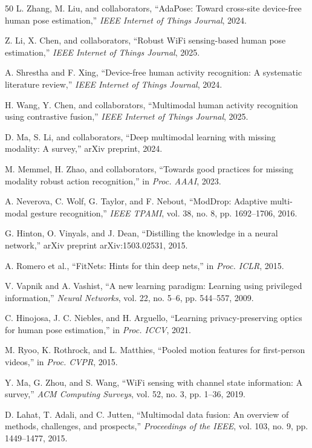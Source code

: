 \documentclass[journal]{IEEEtran}
\begin{document}
\begin{thebibliography}{50}
L. Zhang, M. Liu, and collaborators, ``AdaPose: Toward cross-site device-free human pose estimation,'' \emph{IEEE Internet of Things Journal}, 2024.

Z. Li, X. Chen, and collaborators, ``Robust WiFi sensing-based human pose estimation,'' \emph{IEEE Internet of Things Journal}, 2025.

A. Shrestha and F. Xing, ``Device-free human activity recognition: A systematic literature review,'' \emph{IEEE Internet of Things Journal}, 2024.

H. Wang, Y. Chen, and collaborators, ``Multimodal human activity recognition using contrastive fusion,'' \emph{IEEE Internet of Things Journal}, 2025.

D. Ma, S. Li, and collaborators, ``Deep multimodal learning with missing modality: A survey,'' arXiv preprint, 2024.

M. Memmel, H. Zhao, and collaborators, ``Towards good practices for missing modality robust action recognition,'' in \emph{Proc. AAAI}, 2023.

A. Neverova, C. Wolf, G. Taylor, and F. Nebout, ``ModDrop: Adaptive multi-modal gesture recognition,'' \emph{IEEE TPAMI}, vol. 38, no. 8, pp. 1692--1706, 2016.

G. Hinton, O. Vinyals, and J. Dean, ``Distilling the knowledge in a neural network,'' arXiv preprint arXiv:1503.02531, 2015.

A. Romero et al., ``FitNets: Hints for thin deep nets,'' in \emph{Proc. ICLR}, 2015.

V. Vapnik and A. Vashist, ``A new learning paradigm: Learning using privileged information,'' \emph{Neural Networks}, vol. 22, no. 5--6, pp. 544--557, 2009.

C. Hinojosa, J. C. Niebles, and H. Arguello, ``Learning privacy-preserving optics for human pose estimation,'' in \emph{Proc. ICCV}, 2021.

M. Ryoo, K. Rothrock, and L. Matthies, ``Pooled motion features for first-person videos,'' in \emph{Proc. CVPR}, 2015.

Y. Ma, G. Zhou, and S. Wang, ``WiFi sensing with channel state information: A survey,'' \emph{ACM Computing Surveys}, vol. 52, no. 3, pp. 1--36, 2019.

D. Lahat, T. Adali, and C. Jutten, ``Multimodal data fusion: An overview of methods, challenges, and prospects,'' \emph{Proceedings of the IEEE}, vol. 103, no. 9, pp. 1449--1477, 2015.


\end{thebibliography}
\end{document}
